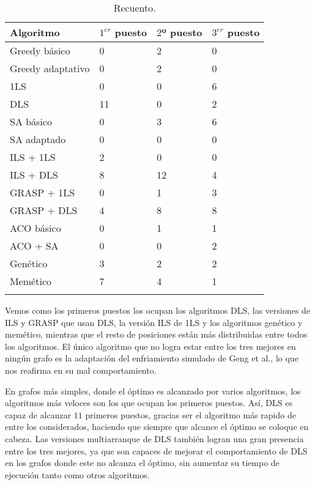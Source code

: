 \begin{small}
\begin{longtable}{l l l l}
  \label{table:recuento}\\
  \endhead
  \endfoot
    Algoritmo              & $1^{er}$ puesto & $2$º puesto & $3^{er}$ puesto \\ \hline
    Greedy básico          &  0  &  2  &  0  \\ \hline
    Greedy adaptativo      &  0  &  2  &  0  \\ \hline
    1LS                    &  0  &  0  &  6  \\ \hline
    DLS                    &  11  &  0  &  2  \\ \hline
    SA básico              &  0  &  3  &  6  \\ \hline
    SA adaptado            &  0  &  0  &  0  \\ \hline
    ILS + 1LS              &  2  &  0  &  0  \\ \hline
    ILS + DLS              &  8  &  12  &  4  \\ \hline
    GRASP + 1LS            &  0  &  1  &  3  \\ \hline
    GRASP + DLS            &  4  &  8  &  8  \\ \hline
    ACO básico             &  0  &  1  &  1  \\ \hline
    ACO + SA               &  0  &  0  &  2  \\ \hline
    Genético               &  3  &  2  &  2  \\ \hline
    Memético               &  7  &  4  &  1  \\ \hline
  \caption{Recuento.}
\end{longtable}
\end{small}

Vemos como los primeros puestos los ocupan los algoritmos DLS, las versiones de ILS y
GRASP que usan DLS, la versión ILS de 1LS y los algoritmos genético y memético, mientras
que el resto de posiciones están más distribuidas entre todos los algoritmos. El único
algoritmo que no logra estar entre los tres mejores en ningún grafo es la adaptación del
enfriamiento simulado de Geng et al., lo que nos reafirma en su mal comportamiento.

En grafos más simples, donde el óptimo es alcanzado por varios algoritmos, los
algoritmos más veloces son los que ocupan los primeros puestos. Así, DLS es capaz
de alcanzar $11$ primeros puestos, gracias ser el algoritmo más rapido de entre los
considerados, haciendo que siempre que alcance el óptimo se coloque en cabeza.
Las versiones multiarranque de DLS también logran una gran presencia entre los tres
mejores, ya que son capaces de mejorar el comportamiento de DLS en los grafos donde
este no alcanza el óptimo, sin aumentar su tiempo de ejecución tanto como otros algoritmos.

